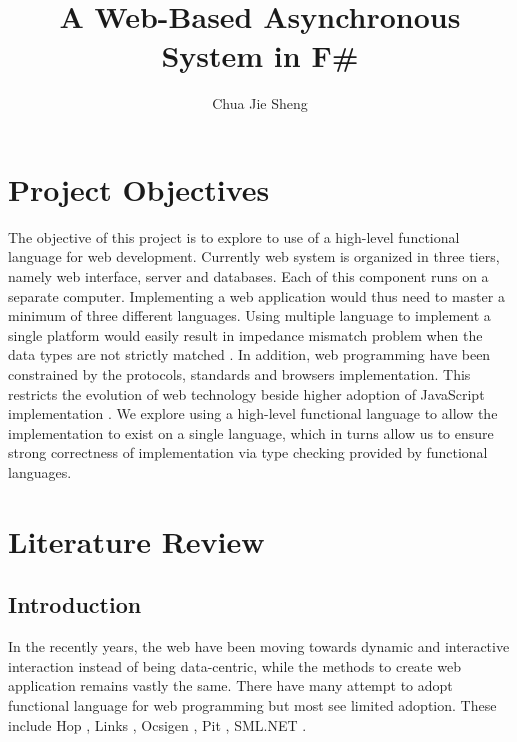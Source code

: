 \documentclass[12pt,fullpage]{article}
\begin{document}
\title{A Web-Based Asynchronous System in F\#}
\author{Chua Jie Sheng}
\maketitle

\section{Project Objectives}
The objective of this project is to explore to use of a high-level functional
language for web development. Currently web system is organized in three tiers,
namely web interface, server and databases. Each of this component runs on a
separate computer. Implementing a web application would thus need to master a
minimum of three different languages. Using multiple language to implement a
single platform would easily result in impedance mismatch problem when the data
types are not strictly matched \parencite{links-fmco06}. In addition, web programming
have been constrained by the protocols, standards and browsers implementation.
This restricts the evolution of web technology beside higher adoption of
JavaScript implementation \parencite{p311-balat}. We explore using a high-level
functional language to allow the implementation to exist on a single language,
which in turns allow us to ensure strong correctness of implementation
via type checking provided by functional languages.

\section{Literature Review}
\subsection{Introduction}
In the recently years, the web have been moving towards dynamic and interactive
interaction instead of being data-centric, while the methods to create web
application remains vastly the same. There have many attempt to adopt functional
language for web programming but most see limited adoption. These include
Hop \parencite{p1001-serran}, Links \parencite{links-fmco06}, Ocsigen \parencite{p84-balat},
Pit \parencite{paper_4}, SML.NET \parencite{p53-Benton}.
\end{document}
